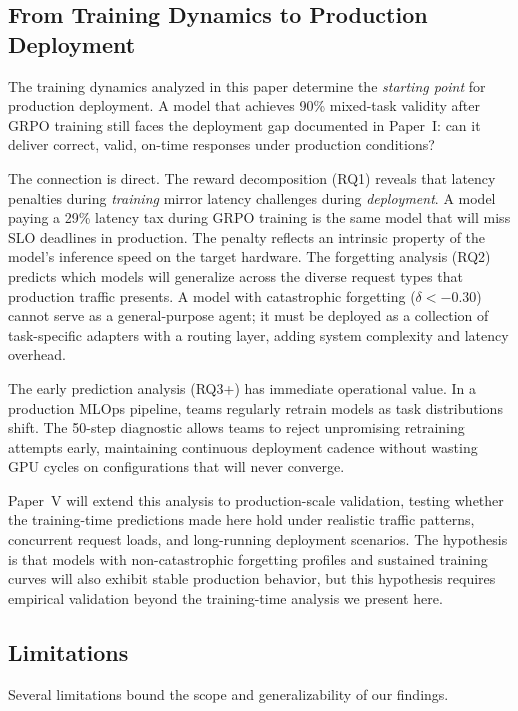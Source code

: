 \documentclass[11pt]{article}
\begin{document}
\subsection{From Training Dynamics to Production Deployment}

The training dynamics analyzed in this paper determine the \emph{starting point} for production deployment.  A model that achieves 90\% mixed-task validity after GRPO training still faces the deployment gap documented in Paper~I: can it deliver correct, valid, on-time responses under production conditions?

The connection is direct.  The reward decomposition (RQ1) reveals that latency penalties during \emph{training} mirror latency challenges during \emph{deployment}.  A model paying a 29\% latency tax during GRPO training is the same model that will miss SLO deadlines in production.  The penalty reflects an intrinsic property of the model's inference speed on the target hardware.  The forgetting analysis (RQ2) predicts which models will generalize across the diverse request types that production traffic presents.  A model with catastrophic forgetting ($\delta < -0.30$) cannot serve as a general-purpose agent; it must be deployed as a collection of task-specific adapters with a routing layer, adding system complexity and latency overhead.

The early prediction analysis (RQ3+) has immediate operational value.  In a production MLOps pipeline, teams regularly retrain models as task distributions shift.  The 50-step diagnostic allows teams to reject unpromising retraining attempts early, maintaining continuous deployment cadence without wasting GPU cycles on configurations that will never converge.

Paper~V will extend this analysis to production-scale validation, testing whether the training-time predictions made here hold under realistic traffic patterns, concurrent request loads, and long-running deployment scenarios.  The hypothesis is that models with non-catastrophic forgetting profiles and sustained training curves will also exhibit stable production behavior, but this hypothesis requires empirical validation beyond the training-time analysis we present here.

\subsection{Limitations}

Several limitations bound the scope and generalizability of our findings.
\end{document}
